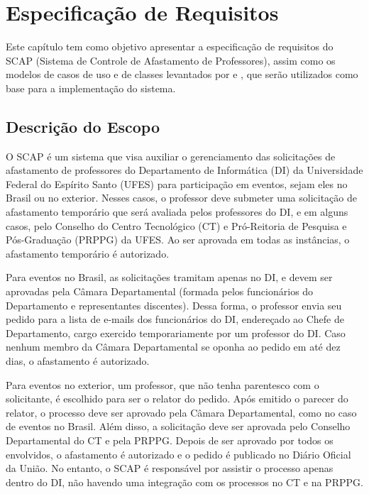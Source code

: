 \chapter{Especificação de Requisitos}
\label{chap-especificacao-requisitos}

Este capítulo tem como objetivo apresentar a especificação de requisitos do SCAP (Sistema de Controle de Afastamento de Professores), 
assim como os modelos de casos de uso e de classes levantados por  e , que serão utilizados como base para a implementação do sistema.

\section{Descrição do Escopo}
\label{sec-espec-escopo}
O SCAP é um sistema que visa auxiliar o gerenciamento das solicitações de
afastamento de professores do Departamento de Informática (DI) da Universidade Federal do Espírito Santo (UFES)
para participação em eventos, sejam eles no Brasil ou no exterior. 
Nesses casos, o professor deve submeter uma solicitação de afastamento temporário
que será avaliada pelos professores do DI, e em alguns casos,
pelo Conselho do Centro Tecnológico (CT) e Pró-Reitoria de Pesquisa e Pós-Graduação (PRPPG) da UFES.
Ao ser aprovada em todas as instâncias, o afastamento temporário é autorizado.

Para eventos no Brasil, as solicitações tramitam apenas no DI, e devem ser
aprovadas pela Câmara Departamental (formada pelos funcionários do Departamento
e representantes discentes). Dessa forma, o professor envia seu pedido para a
lista de e-mails dos funcionários do DI, endereçado ao Chefe de Departamento,
cargo exercido temporariamente por um professor do DI. Caso nenhum membro
da Câmara Departamental se oponha ao pedido em até dez dias, o afastamento é autorizado.

Para eventos no exterior, um professor, que não tenha parentesco com o solicitante,
é escolhido para ser o relator do pedido. Após emitido o parecer do relator, o
processo deve ser aprovado pela Câmara Departamental, como no caso de eventos no Brasil.
Além disso, a solicitação deve ser aprovada pelo Conselho Departamental do CT e pela PRPPG.
Depois de ser aprovado por todos os envolvidos, o afastamento é autorizado
e o pedido é publicado no Diário Oficial da União. 
No entanto, o SCAP é responsável por assistir o processo apenas dentro do DI,
não havendo uma integração com os processos no CT e na PRPPG.


